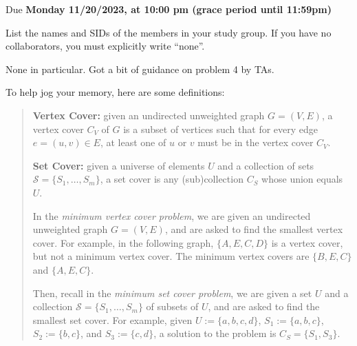 \documentclass[11pt]{article}
\def\duedate{Monday 11/20/2023, at 10:00 pm (grace period until 11:59pm)}
\begin{document}
\maketitle


Due \textbf{\duedate}

List the names and SIDs of the members in your study group.
If you have no collaborators, you must explicitly write ``none''.

\begin{solution}
	None in particular. Got a bit of guidance on problem 4 by TAs.   
\end{solution}


To help jog your memory, here are some definitions:

\begin{quote}
\textbf{Vertex Cover:} given an undirected unweighted graph $G = (V, E)$, a vertex cover $C_V$ of $G$ is a subset of vertices such that for every edge $e=(u, v) \in E$, at least one of $u$ or $v$ must be in the vertex cover $C_V$.

\textbf{Set Cover:} given a universe of elements $U$ and a collection of sets $\mathcal{S} = \{S_1, \dots, S_m\}$, a set cover is any (sub)collection $C_S$  whose union equals $U$.

In the \textit{minimum vertex cover problem}, we are given an undirected unweighted graph $G = (V,E)$, and are asked to find the smallest vertex cover. 
For example, in the following graph,  $\{A, E, C, D\}$ is a vertex cover,  but not a minimum vertex cover.
The minimum vertex covers are $\{B, E, C\}$ and $\{ A, E, C\}$. \vskip 0.5cm
\begin{center}

\end{center}

Then, recall in the \textit{minimum set cover problem}, we are given a set $U$ and a collection $\mathcal{S} = \{S_1, \ldots, S_m\}$ of subsets of $U$, and are asked to find the smallest set cover.
For example, given $U := \{ a, b, c, d \}$, $S_1 := \{a, b, c\}$, $S_2 := \{ b, c\}$,  and $S_3 := \{ c, d \} $, a solution to the problem is $C_S = \{S_1, S_3\}$.
\end{quote}
\end{document}
